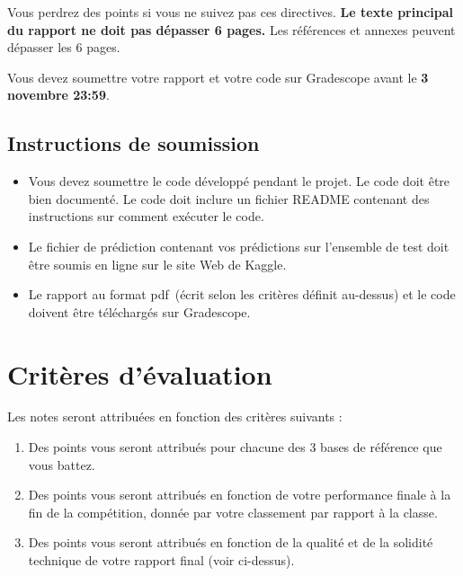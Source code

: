 \documentclass[12pt]{article}
\begin{document}
Vous perdrez des points si vous ne suivez pas ces directives. \textbf{Le texte principal du rapport ne doit pas dépasser 6 pages.} Les références et annexes peuvent dépasser les 6 pages.

Vous devez soumettre votre rapport et votre code sur Gradescope avant le \textbf{3 novembre 23\!\!:59}.

\subsection*{Instructions de soumission}
 
\begin{itemize}
\item Vous devez soumettre le code développé pendant le projet.
Le code doit être bien documenté.
Le code doit inclure un fichier README contenant des instructions sur
comment exécuter le code.
\item Le fichier de prédiction contenant vos prédictions sur l'ensemble de test doit être soumis en ligne sur le site Web de Kaggle.
\item Le rapport au format pdf~(écrit selon les critères définit au-dessus) et le code doivent être téléchargés sur Gradescope.
\end{itemize} 


\section{Critères d'évaluation}


Les notes seront attribuées en fonction des critères suivants :

\begin{enumerate}
     \item Des points vous seront attribués pour chacune des 3 bases de référence que vous battez.
     \item Des points vous seront attribués en fonction de votre performance finale à la fin de la compétition, donnée par votre classement par rapport à la classe.
     \item Des points vous seront attribués en fonction de la qualité et de la solidité technique de votre rapport final (voir ci-dessus).
\end{enumerate} 
\end{document}
